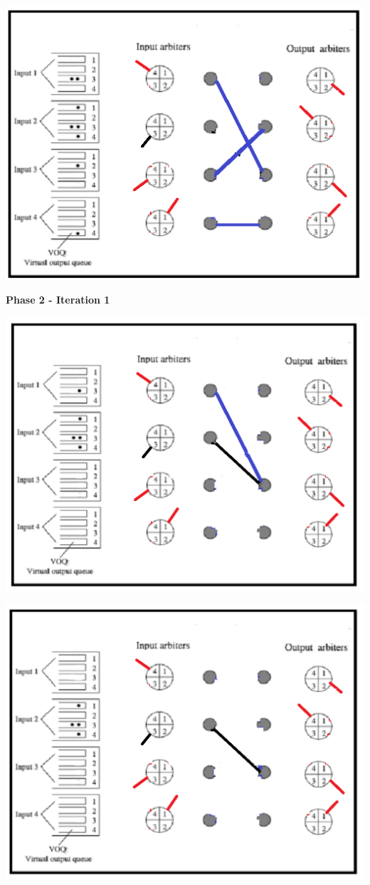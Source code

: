 \begin{qsolve}
	\begin{latin}
		
		\begin{center}
			\includegraphics*[width=0.7\linewidth]{pics/img21.png}
		\end{center}
		
		
		\textbf{Phase 2 - Iteration 1}\\
		\begin{center}
			\includegraphics*[width=0.7\linewidth]{pics/img22.png}
		\end{center}
		
	\end{latin}
\end{qsolve}
\newpage

\begin{qsolve}
	\begin{latin}
		
		\begin{center}
			\includegraphics*[width=0.7\linewidth]{pics/img23.png}
		\end{center}
	\end{latin}
\end{qsolve}
\newpage